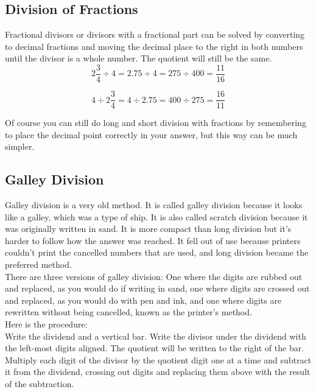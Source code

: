 \documentclass{article}
\begin{document}

\newpage
\subsection{Division of Fractions}
Fractional divisors or divisors with a fractional part can be solved by converting to decimal fractions and moving the decimal place to the right in both numbers until the divisor is a whole number. The quotient will still be the same.
$$2 \frac{3}{4} \div 4 = 2.75 \div 4 = 275 \div 400 = \frac{11}{16}$$

$$4 \div 2 \frac{3}{4} = 4 \div 2.75 = 400 \div 275 = \frac{16}{11}$$

Of course you can still do long and short division with fractions by remembering to place the decimal point correctly in your answer, but this way can be much simpler.\\

\newpage
\subsection{Galley Division}

Galley division is a very old method. It is called galley division because it looks like a galley, which was a type of ship. It is also called scratch division because it was originally written in sand. It is more compact than long division but it's harder to follow how the answer was reached. It fell out of use because printers couldn't print the cancelled numbers that are used, and long division became the preferred method.\\

There are three versions of galley division: One where the digits are rubbed out and replaced, as you would do if writing in sand, one where digits are crossed out and replaced, as you would do with pen and ink, and one where digits are rewritten without being cancelled, known as the printer's method.\\

\newpage
Here is the procedure:\\

Write the dividend and a vertical bar. Write the divisor under the dividend with the left-most digits aligned. The quotient will be written to the right of the bar.\\

Multiply each digit of the divisor by the quotient digit one at a time and subtract it from the dividend, crossing out digits and replacing them above with the result of the subtraction.\\
\end{document}
